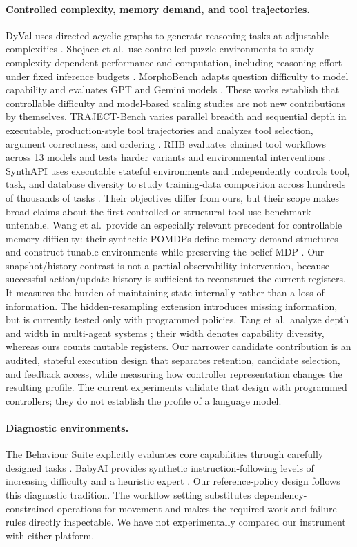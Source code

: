 \documentclass[sigconf,nonacm]{acmart}
\begin{document}
\paragraph{Controlled complexity, memory demand, and tool trajectories.}
DyVal uses directed acyclic graphs to generate reasoning tasks at adjustable
complexities \cite{dyval}. Shojaee et al.\ use controlled puzzle environments
to study complexity-dependent performance and computation, including reasoning
effort under fixed inference budgets \cite{illusion}. MorphoBench adapts
question difficulty to model capability and evaluates GPT and Gemini models
\cite{morphobench}. These works establish that controllable difficulty and model-based scaling
studies are not new contributions by themselves. TRAJECT-Bench varies
parallel breadth and sequential depth in executable, production-style tool
trajectories and analyzes tool selection, argument correctness, and ordering
\cite{traject}. RHB evaluates chained tool workflows across 13 models and
tests harder variants and environmental interventions \cite{rhb}. SynthAPI
uses executable stateful environments and independently controls tool, task,
and database diversity to study training-data composition across hundreds
of thousands of tasks \cite{synthapi}. Their objectives differ from ours,
but their scope makes broad claims about the first controlled or structural
tool-use benchmark untenable.
Wang et al.\ provide an especially relevant precedent for controllable
memory difficulty: their synthetic POMDPs define memory-demand structures
and construct tunable environments while preserving the belief MDP
\cite{mds}. Our snapshot/history contrast is not a partial-observability
intervention, because successful action/update history is sufficient to
reconstruct the current registers. It measures the burden of maintaining
state internally rather than a loss of information. The hidden-resampling
extension introduces missing information, but is currently tested only with
programmed policies.
Tang et al.\ analyze depth and width in multi-agent systems \cite{tang};
their width denotes capability diversity, whereas ours counts mutable
registers. Our narrower candidate contribution is an audited, stateful
execution design that separates retention, candidate selection, and feedback
access, while measuring how controller representation changes the resulting
profile. The current experiments validate that design with programmed
controllers; they do not establish the profile of a language model.

\paragraph{Diagnostic environments.}
The Behaviour Suite explicitly evaluates core capabilities through carefully
designed tasks \cite{bsuite}. BabyAI provides synthetic instruction-following
levels of increasing difficulty and a heuristic expert \cite{babyai}.
Our reference-policy design follows this diagnostic tradition. The
workflow setting substitutes dependency-constrained operations for movement
and makes the required work and failure rules directly inspectable.
We have not experimentally compared our instrument with either platform.
\end{document}
